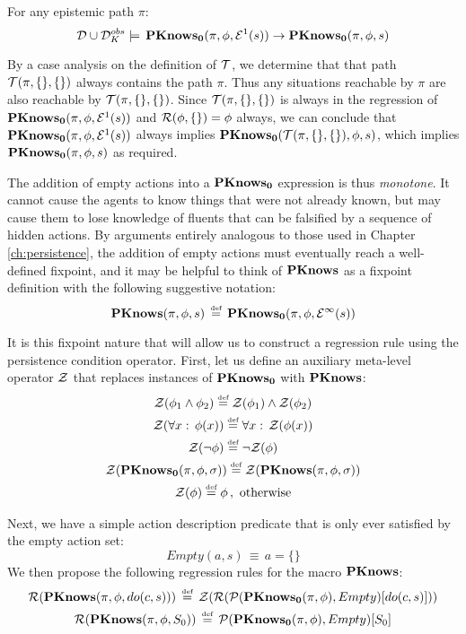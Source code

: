 \begin{thm}
\label{thm:En_impl_En-1}For any epistemic path $\pi$: \[
\mathcal{D}\cup\mathcal{D}_{K}^{obs}\models\,\mathbf{PKnows_{0}}(\pi,\phi,\mathcal{E}^{1}(s))\rightarrow\mathbf{PKnows_{0}}(\pi,\phi,s)\]

\end{thm}
\begin{proofsketch}
By a case analysis on the definition of $\mathcal{T}$, we determine that
that path $\mathcal{T}(\pi,\{\},\{\})$ always contains the path $\pi$.
Thus any situations reachable by $\pi$ are also reachable by $\mathcal{T}(\pi,\{\},\{\})$.
Since $\mathcal{T}(\pi,\{\},\{\})$ is always in the regression of $\mathbf{PKnows_{0}}(\pi,\phi,\mathcal{E}^{1}(s))$
and $\mathcal{R}(\phi,\{\})=\phi$ always, we can conclude that $\mathbf{PKnows_{0}}(\pi,\phi,\mathcal{E}^{1}(s))$
always implies $\mathbf{PKnows_{0}}(\mathcal{T}(\pi,\{\},\{\}),\phi,s)$, which implies
$\mathbf{PKnows_{0}}(\pi,\phi,s)$ as required. 
\end{proofsketch}
The addition of empty actions into a $\mathbf{PKnows_{0}}$ expression is thus
\emph{monotone}. It cannot cause the agents to know things that were
not already known, but may cause them to lose knowledge of fluents
that can be falsified by a sequence of hidden actions. By arguments
entirely analogous to those used in Chapter \ref{ch:persistence},
the addition of empty actions must eventually reach a well-defined
fixpoint, and it may be helpful to think of $\mathbf{PKnows}$ as a fixpoint
definition with the following suggestive notation:\[
\mathbf{PKnows}(\pi,\phi,s)\,\stackrel{\mbox{\tiny def}}{=}\,\mathbf{PKnows_{0}}(\pi,\phi,\mathcal{E}^{\infty}(s))\]


It is this fixpoint nature that will allow us to construct a regression
rule using the persistence condition operator. First, let us define
an auxiliary meta-level operator $\mathcal{Z}$ that replaces instances of
$\mathbf{PKnows_{0}}$ with $\mathbf{PKnows}$:\begin{gather*}
\mathcal{Z}(\phi_{1}\wedge\phi_{2})\stackrel{\mbox{\tiny def}}{=}\mathcal{Z}(\phi_{1})\wedge\mathcal{Z}(\phi_{2})\\
\mathcal{Z}(\forall x:\,\phi(x))\stackrel{\mbox{\tiny def}}{=}\forall x:\,\mathcal{Z}(\phi(x))\\
\mathcal{Z}(\neg\phi)\stackrel{\mbox{\tiny def}}{=}\neg\mathcal{Z}(\phi)\\
\mathcal{Z}(\mathbf{PKnows_{0}}(\pi,\phi,\sigma))\stackrel{\mbox{\tiny def}}{=}\mathcal{Z}(\mathbf{PKnows}(\pi,\phi,\sigma))\\
\mathcal{Z}(\phi)\stackrel{\mbox{\tiny def}}{=}\phi\,,\,\,\mathrm{otherwise}\end{gather*}


Next, we have a simple action description predicate that is only ever
satisfied by the empty action set:\[
Empty(a,s)\,\equiv\, a=\{\}\]
 We then propose the following regression rules for the macro $\mathbf{PKnows}$:\begin{gather}
\mathcal{R}(\mathbf{PKnows}(\pi,\phi,do(c,s)))\,\stackrel{\mbox{\tiny def}}{=}\,\mathcal{Z}(\mathcal{R}(\mathcal{P}(\mathbf{PKnows_{0}}(\pi,\phi),Empty)[do(c,s)]))\label{eq:Reg_PKnows_do}\\
\mathcal{R}(\mathbf{PKnows}(\pi,\phi,S_{0}))\,\stackrel{\mbox{\tiny def}}{=}\,\mathcal{P}(\mathbf{PKnows_{0}}(\pi,\phi),Empty)[S_{0}]\label{eq:Reg_PKnows_S0}\end{gather}


